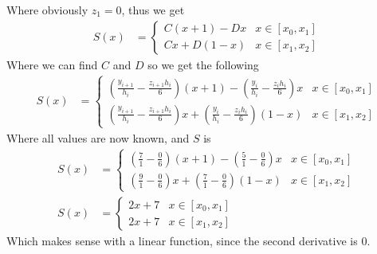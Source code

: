 \documentclass[12pt]{article}
\begin{document}
Where obviously $z_1=0$, thus we get
\begin{align*}
S(x) &= \left\{ \begin{array}{rl}
C(x+1) - Dx &x\in [x_0,x_1]\\
Cx + D(1-x) &x\in [x_1,x_2]
\end{array} \right.
\end{align*}
Where we can find $C$ and $D$ so we get the following
\begin{align*}
S(x) &= \left\{ \begin{array}{rl}
(\frac{y_{i+1}}{h_i}-\frac{z_{i+1}h_i}{6})(x+1) - (\frac{y_i}{h_i}-\frac{z_ih_i}{6}) x &x\in [x_0,x_1]\\
(\frac{y_{i+1}}{h_i}-\frac{z_{i+1}h_i}{6})x + (\frac{y_i}{h_i}-\frac{z_ih_i}{6})(1-x) &x\in [x_1,x_2]
\end{array} \right.
\end{align*}
Where all values are now known, and $S$ is
\begin{align*}
S(x) &= \left\{ \begin{array}{rl}
(\frac{7}{1}-\frac{0}{6})(x+1) - (\frac{5}{1}-\frac{0}{6}) x &x\in [x_0,x_1]\\
(\frac{9}{1}-\frac{0}{6})x + (\frac{7}{1}-\frac{0}{6})(1-x) &x\in [x_1,x_2]
\end{array} \right. \\
S(x) &= \left\{ \begin{array}{rl}
2x+7 &x\in [x_0,x_1]\\
2x+7 &x\in [x_1,x_2]
\end{array} \right.
\end{align*}
Which makes sense with a linear function, since the second derivative is $0$.
\end{document}
